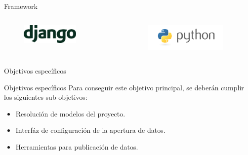 \documentclass[spanish,xcolor=table,svgnames]{beamer}
\begin{document}
\begin{frame}{Framework}
  \begin{columns}[onlytextwidth]
    \begin{column}{0.5\textwidth}
      \centering
      \begin{figure}[H]
        \begin{center}
            \includegraphics[width=0.7\textwidth]{img/django.png}
        \end{center}
        \label{fig:django}
      \end{figure}
    \end{column}
    \begin{column}{0.5\textwidth}
      \centering
      \begin{figure}[H]
        \begin{center}
            \includegraphics[width=1.0\textwidth]{img/python.png}
        \end{center}
        \label{fig:python}
      \end{figure}
    \end{column}
​  \end{columns}
\end{frame}

\begin{frame}{Objetivos específicos}
\begin{block}{Objetivos específicos}
Para conseguir este objetivo principal, se deberán cumplir los siguientes sub-objetivos:
\begin{itemize}
    \item Resolución de modelos del proyecto.
    \item Interfáz de configuración de la apertura de datos.
    \item Herramientas para publicación de datos.
\end{itemize}
\end{block}
\end{frame}
\end{document}

